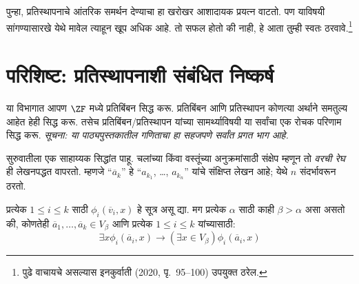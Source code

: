 पुन्हा, प्रतिस्थापनाचे आंतरिक समर्थन देण्याचा हा खरोखर आशादायक प्रयत्न वाटतो. पण याविषयी सांगण्यासारखे येथे मावेल त्याहून खूप अधिक आहे. तो सफल होतो की नाही, हे आता तुम्ही स्वतः ठरवावे.\footnote{पुढे वाचायचे असल्यास इनकुर्वाती (2020, पृ.~95--100) उपयुक्त ठरेल.}







\section{परिशिष्ट: प्रतिस्थापनाशी संबंधित निष्कर्ष}\label{sth:replacement:refproofs:sec}

या विभागात आपण $\ZF$ मध्ये प्रतिबिंबन सिद्ध करू. प्रतिबिंबन आणि प्रतिस्थापन कोणत्या अर्थाने समतुल्य आहेत हेही सिद्ध करू. तसेच प्रतिबिंबन/प्रतिस्थापन यांच्या सामर्थ्याविषयी या सर्वांचा एक रोचक परिणाम सिद्ध करू. \emph{सूचना: या पाठ्यपुस्तकातील गणिताचा हा सहजपणे सर्वांत प्रगत भाग आहे.}

सुरुवातीला एक साहाय्यक सिद्धांत पाहू. चलांच्या किंवा वस्तूंच्या अनुक्रमांसाठी संक्षेप म्हणून तो \emph{वरची रेघ} ही लेखनपद्धत वापरतो. म्हणजे ``$\overline{a}_k$'' हे ``$a_{k_1}$, \dots,
$a_{k_n}$'' यांचे संक्षिप्त लेखन आहे; येथे $n$ संदर्भावरून ठरतो.

\begin{lem}\label{sth:replacement:refproofs:lemreflection}
प्रत्येक $1 \leq i \leq k$ साठी $\phi_i(\overline{v}_i, x)$ हे सूत्र असू द्या. मग प्रत्येक $\alpha$ साठी काही $\beta > \alpha$ असा असतो की, कोणतेही $\overline{a}_1,
\ldots, \overline{a}_k \in V_\beta$ आणि प्रत्येक $1 \leq i \leq k$ यांच्यासाठी:
\[
  \exists x\phi_i(\overline{a}_i, x) \rightarrow (\exists x \in V_\beta) \phi_i(\overline{a}_i, x)
\]
\end{lem}

